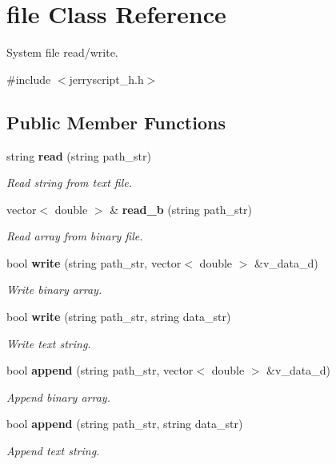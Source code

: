 \section{file Class Reference}
\label{classfile}


System file read/write.  




{\ttfamily \#include $<$jerryscript\+\_\+h.\+h$>$}

\subsection*{Public Member Functions}
\begin{DoxyCompactItemize}
\item 
string \textbf{ read} (string path\+\_\+str)
\begin{DoxyCompactList}\small\item\em Read string from text file. \end{DoxyCompactList}\item 
vector$<$ double $>$ \& \textbf{ read\+\_\+b} (string path\+\_\+str)
\begin{DoxyCompactList}\small\item\em Read array from binary file. \end{DoxyCompactList}\item 
bool \textbf{ write} (string path\+\_\+str, vector$<$ double $>$ \&v\+\_\+data\+\_\+d)
\begin{DoxyCompactList}\small\item\em Write binary array. \end{DoxyCompactList}\item 
bool \textbf{ write} (string path\+\_\+str, string data\+\_\+str)
\begin{DoxyCompactList}\small\item\em Write text string. \end{DoxyCompactList}\item 
bool \textbf{ append} (string path\+\_\+str, vector$<$ double $>$ \&v\+\_\+data\+\_\+d)
\begin{DoxyCompactList}\small\item\em Append binary array. \end{DoxyCompactList}\item 
bool \textbf{ append} (string path\+\_\+str, string data\+\_\+str)
\begin{DoxyCompactList}\small\item\em Append text string. \end{DoxyCompactList}\end{DoxyCompactItemize}


